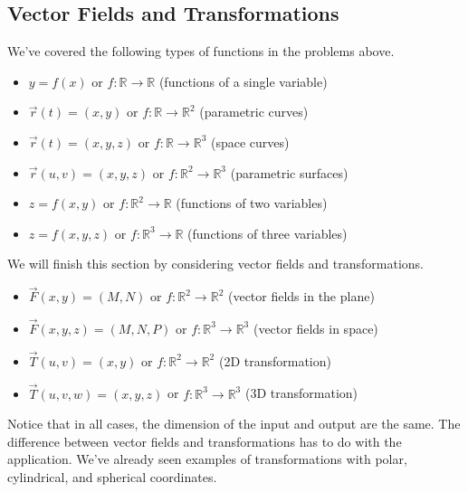 \subsection{Vector Fields and Transformations}

We've covered the following types of functions in the problems above.
\begin{itemize}
 \item $y=f(x)$ or $f:\mathbb{R}\to\mathbb{R}$ (functions of a single variable)
 \item $\vec r(t)=(x,y)$ or $f:\mathbb{R}\to\mathbb{R}^2$ (parametric curves)
 \item $\vec r(t)=(x,y,z)$ or $f:\mathbb{R}\to\mathbb{R}^3$ (space curves)
 \item $\vec r(u,v)=(x,y,z)$ or $f:\mathbb{R}^2\to\mathbb{R}^3$ (parametric surfaces)
 \item $z=f(x,y)$ or $f:\mathbb{R}^2\to\mathbb{R}$ (functions of two variables)
 \item $z=f(x,y,z)$ or $f:\mathbb{R}^3\to\mathbb{R}$ (functions of three variables)
\end{itemize}
We will finish this section by considering vector fields and transformations. 
\begin{itemize}
 \item $\vec F(x,y)=(M,N)$ or $f:\mathbb{R}^2\to\mathbb{R}^2$ (vector fields in the plane)
 \item $\vec F(x,y,z)=(M,N,P)$ or $f:\mathbb{R}^3\to\mathbb{R}^3$ (vector fields in space)
 \item $\vec T(u,v)=(x,y)$ or $f:\mathbb{R}^2\to\mathbb{R}^2$ (2D transformation)
 \item $\vec T(u,v,w)=(x,y,z)$ or $f:\mathbb{R}^3\to\mathbb{R}^3$ (3D transformation)
\end{itemize}
Notice that in all cases, the dimension of the input and output are the same. The difference between vector fields and transformations has to do with the application. We've already seen examples of transformations with polar, cylindrical, and spherical coordinates.


